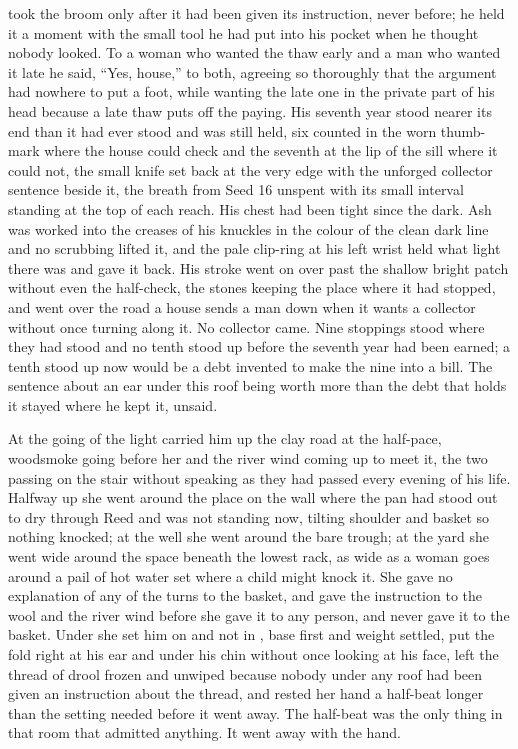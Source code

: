  took the broom only after it had been given its instruction, never before; he held it a moment with the small tool he had put into his pocket when he thought nobody looked. To a woman who wanted the thaw early and a man who wanted it late he said, “Yes, house,” to both, agreeing so thoroughly that the argument had nowhere to put a foot, while wanting the late one in the private part of his head because a late thaw puts off the paying. His seventh year stood nearer its end than it had ever stood and was still held, six counted in the worn thumb-mark where the house could check and the seventh at the lip of the sill where it could not, the small knife set back at the very edge with the unforged collector sentence beside it, the breath from Seed 16 unspent with its small interval standing at the top of each reach. His chest had been tight since the dark. Ash was worked into the creases of his knuckles in the colour of the clean dark line and no scrubbing lifted it, and the pale clip-ring at his left wrist held what light there was and gave it back. His stroke went on over  past the shallow bright patch without even the half-check, the stones keeping the place where it had stopped, and went over the road a house sends a man down when it wants a collector without once turning along it. No collector came. Nine stoppings stood where they had stood and no tenth stood up before the seventh year had been earned; a tenth stood up now would be a debt invented to make the nine into a bill. The sentence about an ear under this roof being worth more than the debt that holds it stayed where he kept it, unsaid.

\scenebreak

At the going of the light  carried him up the clay road at the half-pace, woodsmoke going before her and the river wind coming up to meet it, the two passing on the stair without speaking as they had passed every evening of his life. Halfway up she went around the place on the wall where the pan had stood out to dry through Reed and was not standing now, tilting shoulder and basket so nothing knocked; at the well she went around the bare trough; at the yard she went wide around the space beneath the lowest rack, as wide as a woman goes around a pail of hot water set where a child might knock it. She gave no explanation of any of the turns to the basket, and gave the instruction to the wool and the river wind before she gave it to any person, and never gave it to the basket. Under  she set him on  and not in , base first and weight settled, put the fold right at his ear and under his chin without once looking at his face, left the thread of drool frozen and unwiped because nobody under any roof had been given an instruction about the thread, and rested her hand a half-beat longer than the setting needed before it went away. The half-beat was the only thing in that room that admitted anything. It went away with the hand.

